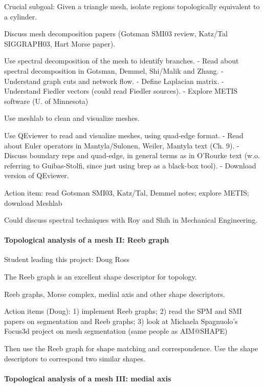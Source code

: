 \documentclass[11pt]{article}
\begin{document}
Crucial subgoal: Given a triangle mesh, isolate regions topologically 
equivalent to a cylinder.

Discuss mesh decomposition papers (Gotsman SMI03 review, Katz/Tal SIGGRAPH03, 
Hart Morse paper).

Use spectral decomposition of the mesh to identify branches.
- Read about spectral decomposition in Gotsman, Demmel, Shi/Malik and Zhang.
- Understand graph cuts and network flow.
- Define Laplacian matrix.
- Understand Fiedler vectors (could read Fiedler sources).
- Explore METIS software (U. of Minnesota)

Use meshlab to clean and visualize meshes.

Use QEviewer to read and visualize meshes, using quad-edge format.
- Read about Euler operators in Mantyla/Sulonen, Weiler, Mantyla text (Ch. 9).
- Discuss boundary reps and quad-edge, in general terms as in O'Rourke text
  (w.o. referring to Guibas-Stolfi, since just using brep as a black-box tool).
- Download version of QEviewer.

Action item: read Gotsman SMI03, Katz/Tal, Demmel notes; explore METIS;
             download Meshlab

Could discuss spectral techniques with Roy and Shih in Mechanical Engineering.


\paragraph{Topological analysis of a mesh II: Reeb graph}

Student leading this project: Doug Ross

The Reeb graph is an excellent shape descriptor for topology.

Reeb graphs, Morse complex, medial axis and other shape descriptors.

Action items (Doug): 
1) implement Reeb graphs; 
2) read the SPM and SMI papers on segmentation and Reeb graphs;
3) look at Michaela Spagnuolo's Focus3d project on mesh segmentation (same people as AIM@SHAPE)

Then use the Reeb graph for shape matching and correspondence.
Use the shape descriptors to correspond two similar shapes.


\paragraph{Topological analysis of a mesh III: medial axis}
\end{document}
